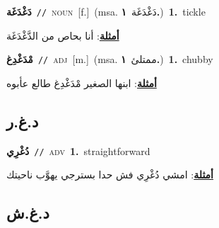 \documentclass[10pt,a4paper,twoside]{article} %
\begin{document}
\begin{multicols}{2}
{\setlength\topsep{0pt}\textbf{\foreignlanguage{arabic}{دَغْدَغَة}}\ {\color{gray}\texttt{//}\color{black}}\ \textsc{noun}\ [f.]\ \color{gray}(msa. \foreignlanguage{arabic}{دَغْدَغَة}~\foreignlanguage{arabic}{\textbf{١.}})\color{black}\ \textbf{1.}~tickle\  \begin{flushright}\color{gray}\foreignlanguage{arabic}{\textbf{\underline{\foreignlanguage{arabic}{أمثلة}}}: أنا بحاص من الدَّغْدَغَة}\end{flushright}\color{black}} \vspace{2mm}

{\setlength\topsep{0pt}\textbf{\foreignlanguage{arabic}{مْدَغْدِغ}}\ {\color{gray}\texttt{//}\color{black}}\ \textsc{adj}\ [m.]\ \color{gray}(msa. \foreignlanguage{arabic}{ممتلئ}~\foreignlanguage{arabic}{\textbf{١.}})\color{black}\ \textbf{1.}~chubby\  \begin{flushright}\color{gray}\foreignlanguage{arabic}{\textbf{\underline{\foreignlanguage{arabic}{أمثلة}}}: ابنها الصغير مْدَغْدِغ طالع عأبوه}\end{flushright}\color{black}} \vspace{2mm}

\vspace{-3mm}
\subsection*{\color{blue}\foreignlanguage{arabic}{د.غ.ر}\color{blue}{ (ntws)}} 

{\setlength\topsep{0pt}\textbf{\foreignlanguage{arabic}{دُغْرِي}}\ {\color{gray}\texttt{//}\color{black}}\ \textsc{adv}\ \textbf{1.}~straightforward\  \begin{flushright}\color{gray}\foreignlanguage{arabic}{\textbf{\underline{\foreignlanguage{arabic}{أمثلة}}}: امشي دُغْرِي فش حدا بسترجي يهوَّب ناحيتك}\end{flushright}\color{black}} \vspace{2mm}

\vspace{-3mm}
\subsection*{\color{blue}\foreignlanguage{arabic}{د.غ.ش}\color{blue}{}} 


\end{multicols}
\end{document}
